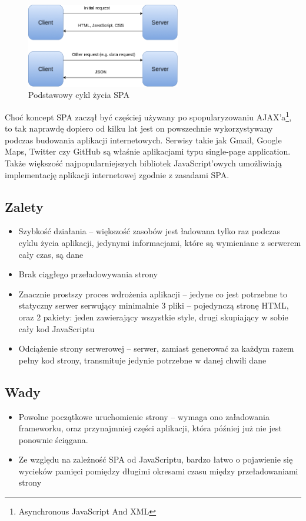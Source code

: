 \begin{figure}[h]
	\centering
	\includegraphics[width=0.6\textwidth]{images/spa}
	\caption{Podstawowy cykl życia SPA}
\end{figure}

Choć koncept SPA zaczął być częściej używany po spopularyzowaniu AJAX'a\footnote{Asynchronous JavaScript And XML}, to tak naprawdę dopiero od kilku lat jest on powszechnie wykorzystywany podczas budowania aplikacji internetowych. Serwisy takie jak Gmail, Google Maps, Twitter czy GitHub są właśnie aplikacjami typu single-page application. Także większość najpopularniejszych bibliotek JavaScript'owych umożliwiają implementację aplikacji internetowej zgodnie z zasadami SPA.
\subsection{Zalety}
\begin{itemize}
	\item Szybkość działania -- większość zasobów jest ładowana tylko raz podczas cyklu życia aplikacji, jedynymi informacjami, które są wymieniane z serwerem cały czas, są dane
	\item Brak ciągłego przeładowywania strony
	\item Znacznie prostszy proces wdrożenia aplikacji -- jedyne co jest potrzebne to statyczny serwer serwujący minimalnie 3 pliki -- pojedynczą stronę HTML, oraz 2 pakiety: jeden zawierający wszystkie style, drugi skupiający w sobie cały kod JavaScriptu
	\item Odciążenie strony serwerowej -- serwer, zamiast generować za każdym razem pełny kod strony, transmituje jedynie potrzebne w danej chwili dane
\end{itemize}
\subsection{Wady}
\begin{itemize}
	\item Powolne początkowe uruchomienie strony -- wymaga ono załadowania frameworku, oraz przynajmniej części aplikacji, która później już nie jest ponownie ściągana.
	\item Ze względu na zależność SPA od JavaScriptu, bardzo łatwo o pojawienie się wycieków pamięci pomiędzy długimi okresami czasu między przeładowaniami strony
\end{itemize}

